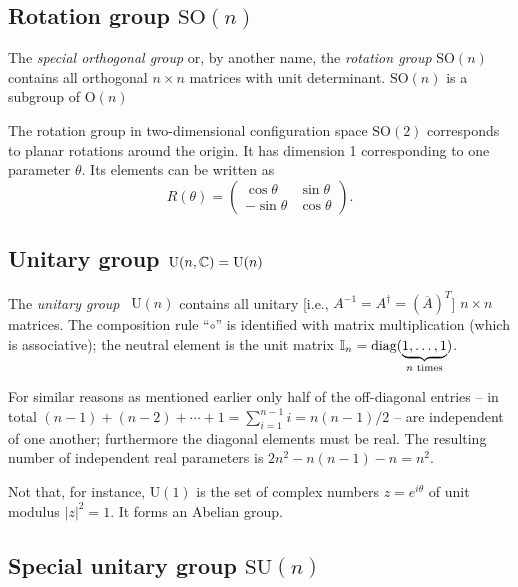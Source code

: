 \subsection{Rotation group $\textrm{SO}(n)$}

The {\em special orthogonal group} or, by another name, the {\em rotation group} $\textrm{SO}(n)$
contains all  orthogonal
$n\times n$ matrices with unit determinant.
$\textrm{SO}(n)$ is a subgroup of $\textrm{O}(n)$

The rotation group in two-dimensional configuration space  $\textrm{SO}(2)$
corresponds to planar rotations around the origin. It has dimension 1 corresponding to one parameter $\theta$.
Its elements can be written as
\begin{equation}
R(\theta )  =
\begin{pmatrix}
\cos \theta & \sin \theta\\
- \sin \theta  & \cos \theta
\end{pmatrix}
.
\end{equation}


\subsection{Unitary group  $\textrm{U}(n,{\Bbb C}) = \textrm{U}(n)$}

The {\em unitary group}~\cite{murnaghan} $\textrm{U}(n)$
contains all  unitary [i.e., $  A  ^{-1}=  A  ^\dagger =(\overline{  A  })^T$]
$n\times n$ matrices.
The composition rule ``$\circ$''
is identified with matrix multiplication (which is associative); the neutral element is the unit
matrix ${\Bbb I}_n=\textrm{diag}(\underbrace{1,\ldots ,1}_{n \textrm{ times}})$.

For similar reasons as mentioned earlier only half of the off-diagonal entries
-- in total $(n-1) + (n-2)+  \cdots +1= \sum_{i=1}^{n-1} i= n(n-1)/2$ --
are independent of one another; furthermore
the diagonal elements must be real.
The resulting number of independent real parameters is $2 n^2 - n(n-1) - n =n^2$.

Not that, for instance,
$\textrm{U}(1)$ is the set of complex numbers $z=e^{i\theta}$ of unit modulus  $|z|^2=1$. It  forms an Abelian group.

\subsection{Special unitary group $\textrm{SU}(n)$}

